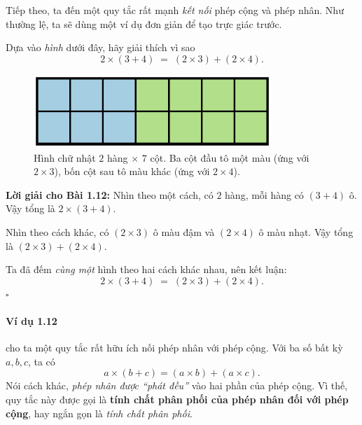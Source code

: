 
Tiếp theo, ta đến một quy tắc rất mạnh \emph{kết nối} phép cộng và phép nhân.
Như thường lệ, ta sẽ dùng một ví dụ đơn giản để tạo trực giác trước.

\begin{problem}[1.12]
Dựa vào \emph{hình} dưới đây, hãy giải thích vì sao
\[
2\times(3+4) \;=\; (2\times3) + (2\times4).
\]

\begin{figure}[ht!]
  \centering
  \includegraphics[width=0.80\textwidth]{img/fig-prob1.12.pdf}
  \caption*{\small Hình chữ nhật \(2\) hàng \(\times\) \(7\) cột.
  Ba cột đầu tô một màu (ứng với \(2\times3\)),
  bốn cột sau tô màu khác (ứng với \(2\times4\)).}
\end{figure}
\end{problem}

\noindent\textbf{Lời giải cho Bài 1.12:}
Nhìn theo một cách, có \(2\) hàng, mỗi hàng có \((3+4)\) ô.
Vậy tổng là \(2\times(3+4)\).

Nhìn theo cách khác, có \((2\times3)\) ô màu đậm và \((2\times4)\) ô màu nhạt.
Vậy tổng là \((2\times3) + (2\times4)\).

Ta đã đếm \emph{cùng một} hình theo hai cách khác nhau, nên kết luận:
\[
2\times(3+4) \;=\; (2\times3) + (2\times4).
\]
\(\square\)


\paragraph{Ví dụ 1.12} cho ta một quy tắc rất hữu ích nối phép nhân với
phép cộng. Với ba số bất kỳ \(a,b,c\), ta có
\[
a\times(b+c)=(a\times b)+(a\times c).
\]
Nói cách khác, \emph{phép nhân được “phát đều”} vào hai phần của phép
cộng. Vì thế, quy tắc này được gọi là \textbf{tính chất phân phối của
phép nhân đối với phép cộng}, hay ngắn gọn là \emph{tính chất phân phối}.

